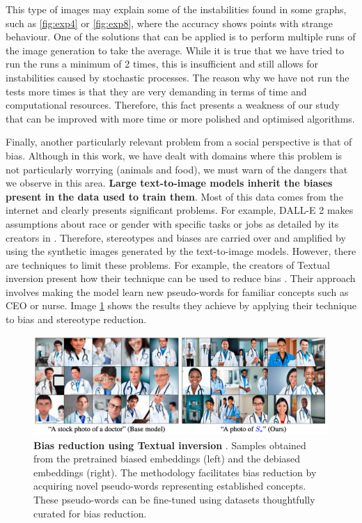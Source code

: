 This type of images may explain some of the instabilities found in some graphs, such as \ref{fig:exp4} or \ref{fig:exp8}, where the accuracy shows points with strange behaviour. One of the solutions that can be applied is to perform multiple runs of the image generation to take the average. While it is true that we have tried to run the runs a minimum of 2 times, this is insufficient and still allows for instabilities caused by stochastic processes. The reason why we have not run the tests more times is that they are very demanding in terms of time and computational resources. Therefore, this fact presents a weakness of our study that can be improved with more time or more polished and optimised algorithms.

Finally, another particularly relevant problem from a social perspective is that of bias. Although in this work, we have dealt with domains where this problem is not particularly worrying (animals and food), we must warn of the dangers that we observe in this area. \textbf{Large text-to-image models inherit the biases present in the data used to train them}. Most of this data comes from the internet and clearly presents significant problems. For example, DALL-E 2 makes assumptions about race or gender with specific tasks or jobs as detailed by its creators in \cite{DALLR}. Therefore, stereotypes and biases are carried over and amplified by using the synthetic images generated by the text-to-image models. However, there are techniques to limit these problems. For example, the creators of Textual inversion present how their technique can be used to reduce bias \cite{gal2022image}. Their approach involves making the model learn new pseudo-words for familiar concepts such as CEO or nurse. Image \ref{fig:bias-textual} shows the results they achieve by applying their technique to bias and stereotype reduction.

\begin{figure}
    \centering
    \includegraphics[width=1\textwidth]{Pictures/bias-text.png} 
    \caption{\textbf{Bias reduction using Textual inversion} \cite{gal2022image}. Samples obtained from the pretrained biased embeddings (left) and the debiased embeddings (right). The methodology facilitates bias reduction by acquiring novel pseudo-words representing established concepts. These pseudo-words can be fine-tuned using datasets thoughtfully curated for bias reduction.}
    \label{fig:bias-textual}
\end{figure}

